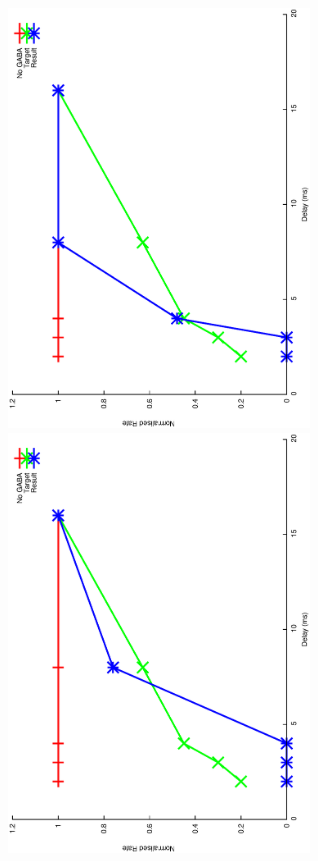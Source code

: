 \documentclass{article}
\begin{document}
\includegraphics[keepaspectratio=true,angle=-90,width=0.6\textwidth]{DS_ClickRecovery_result.33.eps}\clearpage
\includegraphics[keepaspectratio=true,angle=-90,width=0.6\textwidth]{DS_ClickRecovery_result.34.eps}\clearpage
\end{document}
